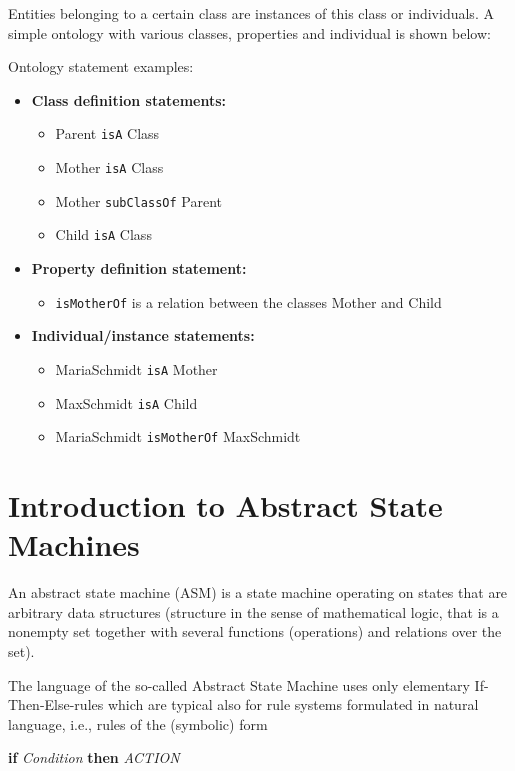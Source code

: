 Entities belonging to a certain class are instances of this class or individuals. A simple ontology with various classes, properties and individual is shown below:

Ontology statement examples:

\begin{itemize}
	\item \textbf {Class definition statements:}
	\begin{itemize}
		\item Parent \texttt{isA} Class
		\item Mother \texttt{isA} Class
		\item Mother \texttt{subClassOf} Parent
		\item Child \texttt{isA} Class
	\end{itemize}
	\item \textbf {Property definition statement:}
	\begin{itemize}
		\item \texttt{isMotherOf} is a relation between the classes Mother and Child
	\end{itemize}
	\item \textbf{Individual/instance statements:}
	\begin{itemize}
		\item MariaSchmidt \texttt{isA} Mother
		\item MaxSchmidt \texttt{isA} Child
		\item MariaSchmidt \texttt{isMotherOf} MaxSchmidt
	\end{itemize}
\end{itemize}

\section{Introduction to Abstract State Machines }

An abstract state machine (ASM) is a state machine operating on states that are arbitrary data structures (structure in the sense of mathematical logic, that is a nonempty set together with several functions (operations) and relations over the set).

The language of the so-called Abstract State Machine uses only elementary If-Then-Else-rules which are typical also for rule systems formulated in natural language, i.e., rules of the (symbolic) form 

\medskip
\textbf{if} \textit{Condition} \textbf{then} \textit{ACTION}
\medskip


